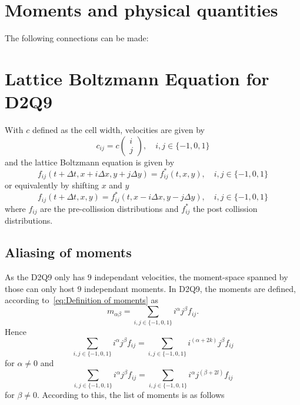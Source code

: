 \documentclass{article}
\begin{document}
\section{Moments and physical quantities}
\label{sec:Moments and physical quantities}

The following connections can be made: 
\begin{table}

\end{table}

\section{Lattice Boltzmann Equation for D2Q9}
\label{sec:Lattice Boltzmann Equation for D2Q9}

With $c$ defined as the cell width, velocities are given by
\begin{equation}
  c_{ij}= c\begin{pmatrix}i \\ j\end{pmatrix}, \quad i,j\in \{-1, 0, 1\}
\end{equation}
and the lattice Boltzmann equation is given by
\begin{equation}
  f_{ij}(t + \Delta t, x + i \Delta x , y + j \Delta y) = f^*_{ij}(t,x,y), \quad i,j\in \{-1, 0, 1\}
\end{equation}
or equivalently by shifting $x$ and $y$
\begin{equation}
  \label{eq:Lattice Boltzmann Equation}
  f_{ij}(t + \Delta t, x, y) = f^*_{ij}(t,x - i\Delta x , y - j\Delta y), \quad i,j\in \{-1, 0, 1\}
\end{equation}
where $f_{ij}$ are the pre-collission distributions and $f^*_{ij}$ the post collission distributions.

\subsection{Aliasing of moments}
\label{sub:Aliasing of moments}

As the D2Q9 only has $9$ independant velocities, the moment-space spanned by those can only host $9$ independant moments.
In D2Q9, the moments are defined, according to~\eqref{eq:Definition of moments} as
\begin{equation*}
  m_{\alpha\beta} = \sum_{i,j \in \{-1,0,1\}} i^\alpha j^\beta f_{ij}.
\end{equation*}
Hence
\begin{equation}
  \sum_{i,j \in \{-1,0,1\}} i^\alpha j^\beta f_{ij} = \sum_{i,j \in \{-1,0,1\}} i^{(\alpha+2k)} j^\beta f_{ij}
\end{equation}
for $\alpha\neq 0$ and
\begin{equation}
  \sum_{i,j \in \{-1,0,1\}} i^\alpha j^\beta f_{ij} = \sum_{i,j \in \{-1,0,1\}} i^\alpha j^{(\beta+2l)} f_{ij}
\end{equation}
for $\beta\neq 0$. According to this, the list of moments is as follows
\end{document}
